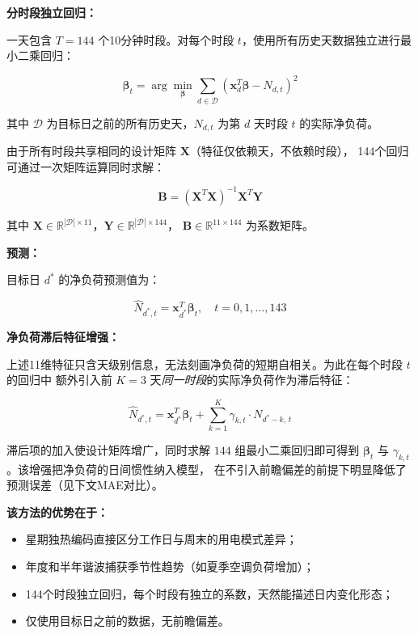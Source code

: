 \documentclass[12pt,a4paper]{article}
\begin{document}
\textbf{分时段独立回归：}

一天包含 $T = 144$ 个10分钟时段。对每个时段 $t$，使用所有历史天数据独立进行最小二乘回归：

\begin{equation}
    \boldsymbol{\beta}_t = \arg\min_{\boldsymbol{\beta}} \sum_{d \in \mathcal{D}} \left(\mathbf{x}_d^T \boldsymbol{\beta} - N_{d,t}\right)^2
\end{equation}

其中 $\mathcal{D}$ 为目标日之前的所有历史天，$N_{d,t}$ 为第 $d$ 天时段 $t$ 的实际净负荷。

由于所有时段共享相同的设计矩阵 $\mathbf{X}$（特征仅依赖天，不依赖时段），
144个回归可通过一次矩阵运算同时求解：

\begin{equation}
    \mathbf{B} = (\mathbf{X}^T \mathbf{X})^{-1} \mathbf{X}^T \mathbf{Y}
\end{equation}

其中 $\mathbf{X} \in \mathbb{R}^{|\mathcal{D}| \times 11}$，$\mathbf{Y} \in \mathbb{R}^{|\mathcal{D}| \times 144}$，
$\mathbf{B} \in \mathbb{R}^{11 \times 144}$ 为系数矩阵。

\textbf{预测：}

目标日 $d^*$ 的净负荷预测值为：

\begin{equation}
    \hat{N}_{d^*,t} = \mathbf{x}_{d^*}^T \boldsymbol{\beta}_t, \quad t = 0, 1, \ldots, 143
\end{equation}

\textbf{净负荷滞后特征增强：}

上述11维特征只含天级别信息，无法刻画净负荷的短期自相关。为此在每个时段 $t$ 的回归中
额外引入前 $K=3$ 天\emph{同一时段}的实际净负荷作为滞后特征：

\begin{equation}
    \hat{N}_{d^*,t} = \mathbf{x}_{d^*}^T \boldsymbol{\beta}_t
        + \sum_{k=1}^{K} \gamma_{k,t} \cdot N_{d^*-k,\,t}
\end{equation}

滞后项的加入使设计矩阵增广，同时求解 $144$ 组最小二乘回归即可得到
$\boldsymbol{\beta}_t$ 与 $\gamma_{k,t}$。该增强把净负荷的日间惯性纳入模型，
在不引入前瞻偏差的前提下明显降低了预测误差（见下文MAE对比）。

\textbf{该方法的优势在于：}
\begin{itemize}
    \item 星期独热编码直接区分工作日与周末的用电模式差异；
    \item 年度和半年谐波捕获季节性趋势（如夏季空调负荷增加）；
    \item 144个时段独立回归，每个时段有独立的系数，天然能描述日内变化形态；
    \item 仅使用目标日之前的数据，无前瞻偏差。
\end{itemize}
\end{document}
